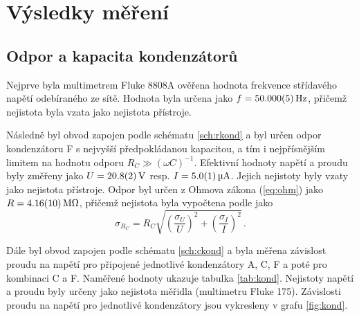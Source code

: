 \documentclass{../concepts/prepareprotokol} %
\newcommand{\relative}[1]{
\frac{\sigma_{#1}}{#1}
}
\newcommand{\squared}[1]{
\left( #1 \right)^2
}
\newcommand{\relsqr}[1]{
\squared{\relative{#1}}
}
\begin{document}
\section{Výsledky měření}

\subsection{Odpor a kapacita kondenzátorů}

Nejprve byla multimetrem Fluke 8808A ověřena hodnota frekvence střídavého napětí odebíraného ze sítě. Hodnota byla určena jako $f = \qty{50.000 \pm 0.005}{Hz}$, přičemž nejistota byla vzata jako nejistota přístroje.

Následně byl obvod zapojen podle schématu \ref{sch:rkond} a byl určen odpor kondenzátoru F s nejvyšší předpokládanou kapacitou, a tím i nejpřísnějším limitem na hodnotu odporu $R_C \gg (\omega C)^{-1}$. Efektivní hodnoty napětí a proudu byly změřeny jako $U= \qty{20.8\pm0.2}{V}$ resp. $I=\qty{5.0\pm0.1}{\micro\ampere}$. Jejich nejistoty byly vzaty jako nejistota přístroje. Odpor byl určen z Ohmova zákona (\ref{eq:ohm}) jako $R = \qty{4.16\pm0.10}{\mega\ohm}$, přičemž nejistota byla vypočtena podle \cite{englich} jako
\begin{equation}
    \sigma_{R_C} = R_C \sqrt{\relsqr{U} + \relsqr{I}} \, .
\end{equation}

Dále byl obvod zapojen podle schématu \ref{sch:ckond} a byla měřena závislost proudu na napětí pro připojené jednotlivé kondenzátory A, C, F a poté pro kombinaci C a F. Naměřené hodnoty ukazuje tabulka \ref{tab:kond}. Nejistoty napětí a proudu byly určeny jako nejistota měřidla (multimetru Fluke 175). Závislosti proudu na napětí pro jednotlivé kondenzátory jsou vykresleny v grafu \ref{fig:kond}. 
\end{document}
